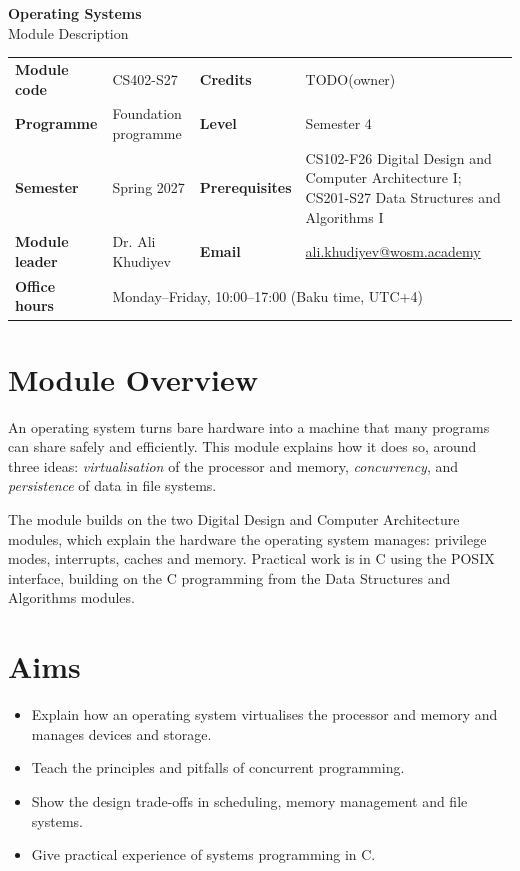 \documentclass[11pt,a4paper]{article}
\makeatletter
\newcommand{\ModuleTitle}{Operating Systems}
\newcommand{\ModuleCode}{CS402-S27}
\newcommand{\Programme}{Foundation programme}
\newcommand{\Level}{Semester 4}
\newcommand{\Semester}{Spring 2027}
\newcommand{\Credits}{TODO(owner)}
\newcommand{\ModuleLeader}{Dr. Ali Khudiyev}
\newcommand{\Email}{ali.khudiyev@wosm.academy}
\newcommand{\OfficeHours}{Monday--Friday, 10:00--17:00 (Baku time, UTC+4)}
\newcommand{\Prerequisites}{CS102-F26 Digital Design and Computer Architecture I; CS201-S27 Data Structures and Algorithms I}
\makeatother
\begin{document}
\begin{center}
  {\LARGE\bfseries\color{accent} \ModuleTitle}\\[4pt]
  {\large Module Description}
\end{center}
\vspace{6pt}

\begin{tabularx}{\textwidth}{>{\bfseries}l X >{\bfseries}l X}
\toprule
Module code   & \ModuleCode    & Credits      & \Credits \\
Programme     & \Programme     & Level        & \Level \\
Semester      & \Semester      & Prerequisites & \Prerequisites \\
Module leader & \ModuleLeader  & Email        & \href{mailto:\Email}{\Email} \\
Office hours  & \multicolumn{3}{l}{\OfficeHours} \\
\bottomrule
\end{tabularx}

\section{Module Overview}
An operating system turns bare hardware into a machine that many programs can share
safely and efficiently. This module explains how it does so, around three ideas:
\emph{virtualisation} of the processor and memory, \emph{concurrency}, and
\emph{persistence} of data in file systems.

The module builds on the two Digital Design and Computer Architecture modules, which
explain the hardware the operating system manages: privilege modes, interrupts,
caches and memory. Practical work is in C using the POSIX interface, building on the
C programming from the Data Structures and Algorithms modules.

\section{Aims}
\begin{itemize}
  \item Explain how an operating system virtualises the processor and memory and manages devices and storage.
  \item Teach the principles and pitfalls of concurrent programming.
  \item Show the design trade-offs in scheduling, memory management and file systems.
  \item Give practical experience of systems programming in C.
\end{itemize}
\end{document}
